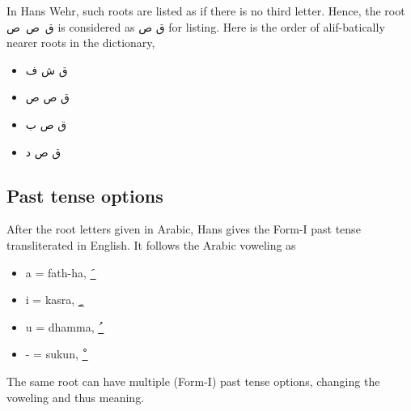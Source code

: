 \begin{itemize}
	In Hans Wehr, such roots are listed as if  there is no third letter. Hence, the root \textarabic{ق~ص~ص} is considered as \textarabic{ق ص} for listing. Here is the order of alif-batically nearer roots in the dictionary,
	
	\begin{itemize}	    \setlength{\itemsep}{5pt}
		\item \textarabic{ق ش ف}
		\item \textarabic{ق ص ص}
		\item \textarabic{ق ص ب}
		\item \textarabic{ق ص د}
	\end{itemize}
\end{itemize}



\subsection{Past tense options}
After the root letters given in Arabic, Hans gives the Form-I past tense transliterated in English. It follows the Arabic voweling as
\begin{itemize}	    \setlength{\itemsep}{5pt}
	\item a = fath-ha, \quad \textarabic{\_َ}
	\item i = kasra, \quad \textarabic{\_ِ}
	\item u = dhamma, \quad \textarabic{\_ُ}
	\item - = sukun,  \quad \textarabic{\_ْ}
\end{itemize}

The same root can have multiple (Form-I) past tense options, changing the voweling and thus meaning. 
 


